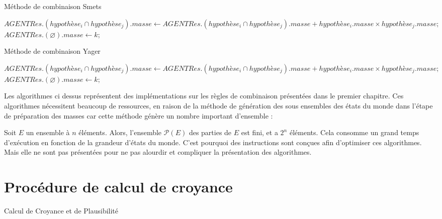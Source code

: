 \begin{algorithm}[H]
\setcounter{AlgoLine}{3}
\caption{Méthode de combinaison Smets}

$AGENTRes.(hypothèse_{i} \cap hypothèse_{j}).masse \gets AGENTRes.(hypothèse_{i} \cap hypothèse_{j}).masse + hypothèse_{i}.masse \times hypothèse_{j}.masse ;$
$AGENTRes.(\varnothing ).masse \gets k;$
\end{algorithm}
\vspace{3em}
\begin{algorithm}[H]
\setcounter{AlgoLine}{9}
\caption{Méthode de combinaison Yager}
$AGENTRes.(hypothèse_{i} \cap hypothèse_{j}).masse \gets AGENTRes.(hypothèse_{i} \cap hypothèse_{j}).masse + hypothèse_{i}.masse \times hypothèse_{j}.masse ;$
$AGENTRes.(\varnothing ).masse \gets k;$
\end{algorithm}
\vspace{3em}
Les algorithmes ci dessus représentent des implémentations sur les règles de combinaison présentées dans le premier chapitre. Ces algorithmes nécessitent beaucoup de ressources, en raison de la méthode de génération des sous ensembles des états du monde dans l'étape de préparation des masses car cette méthode génère un nombre important d'ensemble :

Soit $E$ un ensemble à $n$ éléments. Alors, l'ensemble $\mathcal{P}(E)$ des parties de $E$ est fini, et a \textbf{$2^n$} éléments.
 \newpage
\vspace{4em}
Cela consomme un grand temps d'exécution en fonction de la grandeur d'états du monde. C'est pourquoi des instructions sont conçues afin  d'optimiser ces algorithmes. Mais elle ne sont pas présentées pour ne pas alourdir et compliquer la présentation des algorithmes.
\vspace{2em}
\section{Procédure de calcul de croyance}
\vspace{2em}
\begin{algorithm}[H]
\caption{Calcul de Croyance et de Plausibilité}
\BlankLine
{}
\BlankLine 
\Begin

\end{algorithm}
